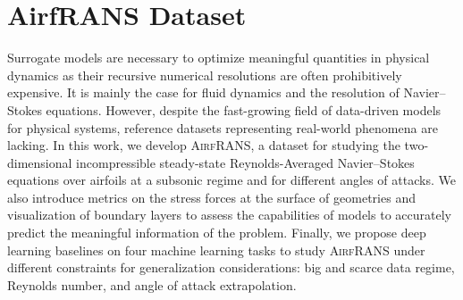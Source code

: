 \chapter{AirfRANS Dataset} %

Surrogate models are necessary to optimize meaningful quantities in physical dynamics as their recursive numerical resolutions are often prohibitively expensive. It is mainly the case for fluid dynamics and the resolution of Navier–Stokes equations. However, despite the fast-growing field of data-driven models for physical systems, reference datasets representing real-world phenomena are lacking. In this work, we develop \textsc{AirfRANS}, a dataset for studying the two-dimensional incompressible steady-state Reynolds-Averaged Navier–Stokes equations over airfoils at a subsonic regime and for different angles of attacks. We also introduce metrics on the stress forces at the surface of geometries and visualization of boundary layers to assess the capabilities of models to accurately predict the meaningful information of the problem. Finally, we propose deep learning baselines on four machine learning tasks to study \textsc{AirfRANS} under different constraints for generalization considerations: big and scarce data regime, Reynolds number, and angle of attack extrapolation.

